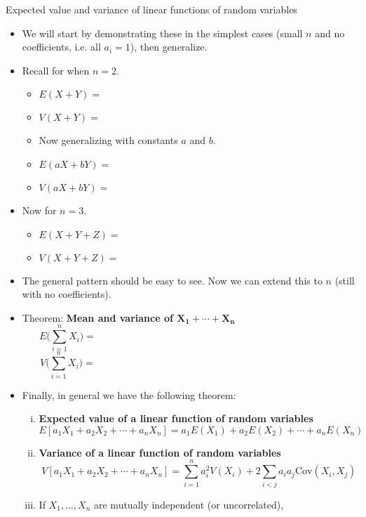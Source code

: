 \documentclass{article}
\newcommand{\vecn}[2]{#1_1, \ldots, #1_{#2}}	%
\newcommand{\cov}[1]{\mathrm{Cov}(#1)}		%
\begin{document}
 \newpage

Expected value and variance of linear functions of random variables\bigskip
\begin{itemize}
    \item We will start by demonstrating these in the simplest cases (small $n$ and no coefficients, i.e. all $a_i = 1$), then generalize. 
    \item Recall for when $n = 2$.
    \begin{itemize}
        \item[] $E(X + Y) = $\bigskip
        \item[] $V(X + Y) = $\bigskip
        \item Now generalizing with constants $a$ and $b$.
        \item[] $E(aX + bY) = $\bigskip
        \item[] $V(aX + bY) = $\bigskip
    \end{itemize}
    \item Now for $n = 3$.
    \begin{itemize}
        \item[] $E(X + Y + Z) = $\vspace{25pt}
        \item[] $V(X + Y + Z) = $\vspace{170pt}
    \end{itemize}
    \item The general pattern should be easy to see. Now we can extend this to $n$ (still with no coefficients).\bigskip
    \item[] Theorem: \textbf{Mean and variance of $\boldsymbol{X_1 + \cdots + X_n}$}
    \[E\bigg(\sum_{i = 1}^n X_i\bigg) = \hspace{300pt}\]
    \[V\bigg(\sum_{i = 1}^n X_i\bigg) = \hspace{300pt}\]\bigskip
    \newpage
    \item Finally, in general we have the following theorem:
    \begin{enumerate}[(i)]
        \item \textbf{Expected value of a linear function of random variables}
        \[E[a_1 X_1 + a_2 X_2+ \cdots + a_n X_n] = a_1 E(X_1) + a_2 E(X_2) + \cdots + a_n E(X_n)\]
        \item \textbf{Variance of a linear function of random variables}
        \[V[a_1 X_1 + a_2 X_2+ \cdots + a_n X_n] = \sum_{i = 1}^n a_i^2 V(X_i) + 2 \sum_{i < j} a_i a_j \cov{X_i,X_j}\]
        \item[] If $\vecn{X}{n}$ are mutually independent (or uncorrelated),

\end{enumerate}
\end{itemize}
\end{document}
